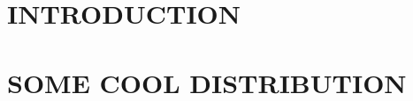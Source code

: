 \documentclass[12pt]{caltech_thesis}
\begin{document}
\renewcommand{\thesection}{}   
\renewcommand{\thesubsection}{}   

\renewcommand{\thefigure}{\arabic{chapter}.\arabic{figure}}
\renewcommand{\thetable}{\arabic{chapter}.\arabic{table}}   


\chapter{INTRODUCTION}


\chapter{SOME COOL DISTRIBUTION}


\printbibliography[heading=bibintoc, title=REFERENCES]

\appendix

%
\end{document}
